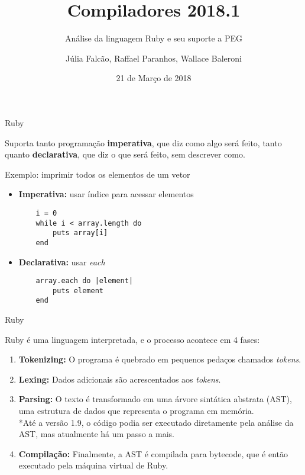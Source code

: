 \documentclass{beamer}
\title{Compiladores 2018.1}
\subtitle{Análise da linguagem Ruby e seu suporte a PEG}
\author[Abrev.]{Júlia Falcão, Raffael Paranhos, Wallace Baleroni}
\institute[UFF]{Universidade Federal Fluminense}
\date{21 de Março de 2018}
\begin{document}

\begin{frame}[plain]

\titlepage

\end{frame}


\begin{frame}[fragile]{Ruby}

Suporta tanto programação \textbf{imperativa}, que diz como algo será feito, tanto quanto \textbf{declarativa}, que diz o que será feito, sem descrever como.
    
Exemplo: imprimir todos os elementos de um vetor

\begin{itemize}
\item \textbf{Imperativa:} usar índice para acessar elementos
	\begin{verbatim}
    i = 0
    while i < array.length do
        puts array[i]
    end
	\end{verbatim}
    
\item \textbf{Declarativa:} usar \textit{each}
	\begin{verbatim}
    array.each do |element|
        puts element
    end
\end{verbatim}

\end{itemize}

\end{frame}


\begin{frame}{Ruby}

Ruby é uma linguagem interpretada, e o processo acontece em 4 fases:

\begin{enumerate}

\item \textbf{Tokenizing:} O programa é quebrado em pequenos pedaços chamados \textit{tokens}.

\item \textbf{Lexing:} Dados adicionais são acrescentados aos \textit{tokens}.

\item \textbf{Parsing:} O texto é transformado em uma árvore sintática abstrata (AST), uma estrutura de dados que representa o programa em memória.
\\*Até a versão 1.9, o código podia ser executado diretamente pela análise da AST, mas atualmente há um passo a mais.

\item \textbf{Compilação:} Finalmente, a AST é compilada para bytecode, que é então executado pela máquina virtual de Ruby.

\end{enumerate}

\end{frame}
\end{document}

